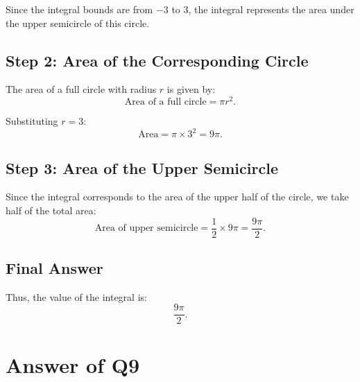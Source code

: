 \documentclass{article}
\begin{document}
Since the integral bounds are from \(-3\) to \(3\), the integral represents the area under the upper semicircle of this circle.
\begin{center}
\end{center}
\subsection*{Step 2: Area of the Corresponding Circle}
The area of a full circle with radius \(r\) is given by:
\[
\text{Area of a full circle} = \pi r^2.
\]

Substituting \(r = 3\):
\[
\text{Area} = \pi \times 3^2 = 9\pi.
\]

\subsection*{Step 3: Area of the Upper Semicircle}
Since the integral corresponds to the area of the upper half of the circle, we take half of the total area:
\[
\text{Area of upper semicircle} = \frac{1}{2} \times 9\pi = \frac{9\pi}{2}.
\]

\subsection*{Final Answer}
Thus, the value of the integral is:
\[
\boxed{\frac{9\pi}{2}}.
\]
\section*{Answer of Q9}
\end{document}
